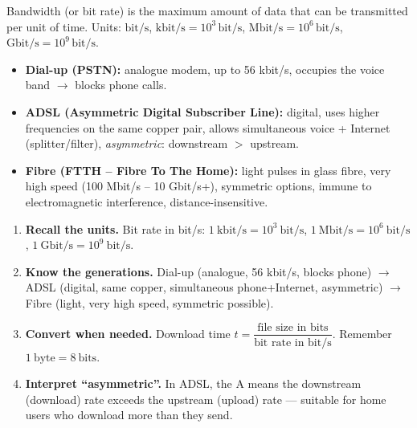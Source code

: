 \documentclass[11pt]{article}
\newcommand{\cle}[1]{{\popxbold\color{popdark}#1}}
\begin{document}
\begin{definition}
\cle{Bandwidth} (or bit rate) is the maximum amount of data that can be transmitted per unit of time. Units: $\mathrm{bit/s}$, $\mathrm{kbit/s}=10^3\,\mathrm{bit/s}$, $\mathrm{Mbit/s}=10^6\,\mathrm{bit/s}$, $\mathrm{Gbit/s}=10^9\,\mathrm{bit/s}$.
\end{definition}

\begin{propriete}
\begin{itemize}
\item \textbf{Dial-up (PSTN):} analogue modem, up to 56 kbit/s, occupies the voice band $\rightarrow$ blocks phone calls.
\item \textbf{ADSL (Asymmetric Digital Subscriber Line):} digital, uses higher frequencies on the same copper pair, allows simultaneous voice + Internet (splitter/filter), \emph{asymmetric}: downstream $>$ upstream.
\item \textbf{Fibre (FTTH -- Fibre To The Home):} light pulses in glass fibre, very high speed (100 Mbit/s -- 10 Gbit/s+), symmetric options, immune to electromagnetic interference, distance-insensitive.
\end{itemize}
\end{propriete}

\begin{methode}
\begin{enumerate}
\item \textbf{Recall the units.} Bit rate in bit/s: $1\ \mathrm{kbit/s} = 10^3\ \mathrm{bit/s}$, $1\ \mathrm{Mbit/s} = 10^6\ \mathrm{bit/s}$, $1\ \mathrm{Gbit/s} = 10^9\ \mathrm{bit/s}$.
\item \textbf{Know the generations.} Dial-up (analogue, 56 kbit/s, blocks phone) $\rightarrow$ ADSL (digital, same copper, simultaneous phone+Internet, asymmetric) $\rightarrow$ Fibre (light, very high speed, symmetric possible).
\item \textbf{Convert when needed.} Download time $t = \dfrac{\text{file size in bits}}{\text{bit rate in bit/s}}$. Remember $1\ \text{byte} = 8\ \text{bits}$.
\item \textbf{Interpret ``asymmetric''.} In ADSL, the A means the downstream (download) rate exceeds the upstream (upload) rate — suitable for home users who download more than they send.
\end{enumerate}
\end{methode}
\end{document}
